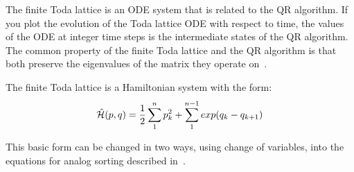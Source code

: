 The finite Toda lattice is an ODE system that is related to the QR algorithm.
If you plot the evolution of the Toda lattice ODE with respect to time, the values of the ODE at integer time steps is the intermediate states of the QR algorithm.
The common property of the finite Toda lattice and the QR algorithm is that both preserve the eigenvalues of the matrix they operate on~\cite{bloch}.

The finite Toda lattice is a Hamiltonian system with the form:
\begin{align}
\hat{\mathcal{H}}(p,q) = \frac{1}{2} \sum^{n}_{1}p_k^2 + \sum^{n-1}_{1}exp(q_k-q_{k+1})
\end{align}

This basic form can be changed in two ways, using change of variables, into the equations for analog sorting described in~\cite{brockett}.






